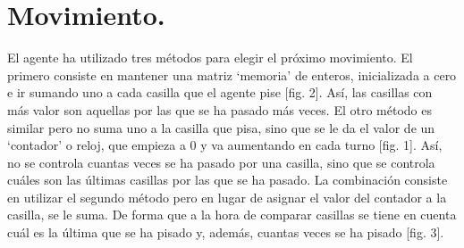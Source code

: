 \documentclass[a4paper, 11pt]{article}
\begin{document}
\renewcommand{\abstractname}{Resumen} %





\pagebreak

\section{Movimiento.}
El agente ha utilizado tres métodos para elegir el próximo movimiento. El primero consiste en mantener una matriz `memoria' de enteros, inicializada a cero e ir sumando uno a cada casilla que el agente pise [fig. 2]. Así, las casillas con más valor son aquellas por las que se ha pasado más veces. El otro método es similar pero no suma uno a la casilla que pisa, sino que se le da el valor de un `contador' o reloj, que empieza a 0 y va aumentando en cada turno [fig. 1]. Así, no se controla cuantas veces se ha pasado por una casilla, sino que se controla cuáles son las últimas casillas por las que se ha pasado. La combinación consiste en utilizar el segundo método pero en lugar de asignar el valor del contador a la casilla, se le suma. De forma que a la hora de comparar casillas se tiene en cuenta cuál es la última que se ha pisado y, además, cuantas veces se ha pisado [fig. 3]. 
\end{document}
